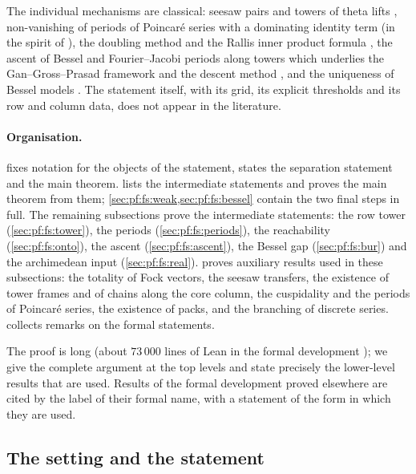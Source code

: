 The individual mechanisms are classical: seesaw pairs and towers of theta lifts \cite{Kudla1994,HarrisKudlaSweet1996},
non-vanishing of periods of Poincar\'e series with a dominating identity term (in the spirit of \cite{Li1992}), the
doubling method and the Rallis inner product formula \cite{GelbartPiatetskiShapiroRallis1987,Rallis1984inj}, the ascent
of Bessel and Fourier--Jacobi periods along towers which underlies the Gan--Gross--Prasad framework and the descent method
\cite{GanGrossPrasad2012,GinzburgRallisSoudry2011}, and the uniqueness of Bessel models \cite{JiangSunZhu2010,SunZhu2012}.
The statement itself, with its grid, its explicit thresholds and its row and column data, does not appear in the
literature.

\paragraph{Organisation.}
 fixes notation for the objects of the statement, states the separation statement and the
main theorem.  lists the intermediate statements and proves the main theorem from them;
\cref{sec:pf:fs:weak,sec:pf:fs:bessel} contain the two final steps in full. The remaining subsections prove the
intermediate statements: the row tower (\cref{sec:pf:fs:tower}), the periods (\cref{sec:pf:fs:periods}), the
reachability (\cref{sec:pf:fs:onto}), the ascent (\cref{sec:pf:fs:ascent}), the Bessel gap (\cref{sec:pf:fs:bur}) and the
archimedean input (\cref{sec:pf:fs:real}).  proves auxiliary results used in these subsections: the totality of Fock
vectors, the seesaw transfers, the existence of tower frames and of chains along the core column, the cuspidality and the periods of
Poincar\'e series, the existence of packs, and the branching of discrete series.  collects remarks on the formal
statements.

The proof is long (about $73\,000$ lines of Lean in the formal development \cite{LeanSource2026}); we give the complete
argument at the top levels and state precisely the lower-level results that are used. Results of the formal
development proved elsewhere are cited by the label of their formal name, with a statement of the form in which they are
used.

\subsection{The setting and the statement}\label{sec:pf:fs:setting}

